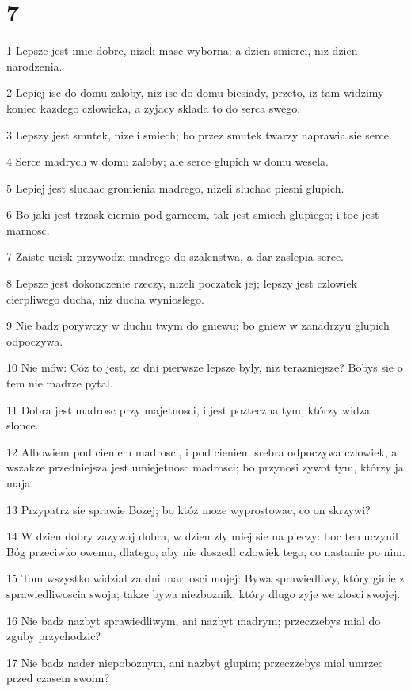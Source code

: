 \chapter{7}

\par 1 Lepsze jest imie dobre, nizeli masc wyborna; a dzien smierci, niz dzien narodzenia.
\par 2 Lepiej isc do domu zaloby, niz isc do domu biesiady, przeto, iz tam widzimy koniec kazdego czlowieka, a zyjacy sklada to do serca swego.
\par 3 Lepszy jest smutek, nizeli smiech; bo przez smutek twarzy naprawia sie serce.
\par 4 Serce madrych w domu zaloby; ale serce glupich w domu wesela.
\par 5 Lepiej jest sluchac gromienia madrego, nizeli sluchac piesni glupich.
\par 6 Bo jaki jest trzask ciernia pod garncem, tak jest smiech glupiego; i toc jest marnosc.
\par 7 Zaiste ucisk przywodzi madrego do szalenstwa, a dar zaslepia serce.
\par 8 Lepsze jest dokonczenie rzeczy, nizeli poczatek jej; lepszy jest czlowiek cierpliwego ducha, niz ducha wynioslego.
\par 9 Nie badz porywczy w duchu twym do gniewu; bo gniew w zanadrzyu glupich odpoczywa.
\par 10 Nie mów: Cóz to jest, ze dni pierwsze lepsze byly, niz terazniejsze? Bobys sie o tem nie madrze pytal.
\par 11 Dobra jest madrosc przy majetnosci, i jest pozteczna tym, którzy widza slonce.
\par 12 Albowiem pod cieniem madrosci, i pod cieniem srebra odpoczywa czlowiek, a wszakze przedniejsza jest umiejetnosc madrosci; bo przynosi zywot tym, którzy ja maja.
\par 13 Przypatrz sie sprawie Bozej; bo któz moze wyprostowac, co on skrzywi?
\par 14 W dzien dobry zazywaj dobra, w dzien zly miej sie na pieczy: boc ten uczynil Bóg przeciwko owemu, dlatego, aby nie doszedl czlowiek tego, co nastanie po nim.
\par 15 Tom wszystko widzial za dni marnosci mojej: Bywa sprawiedliwy, który ginie z sprawiedliwoscia swoja; takze bywa niezboznik, który dlugo zyje we zlosci swojej.
\par 16 Nie badz nazbyt sprawiedliwym, ani nazbyt madrym; przeczzebys mial do zguby przychodzic?
\par 17 Nie badz nader niepoboznym, ani nazbyt glupim; przeczzebys mial umrzec przed czasem swoim?
